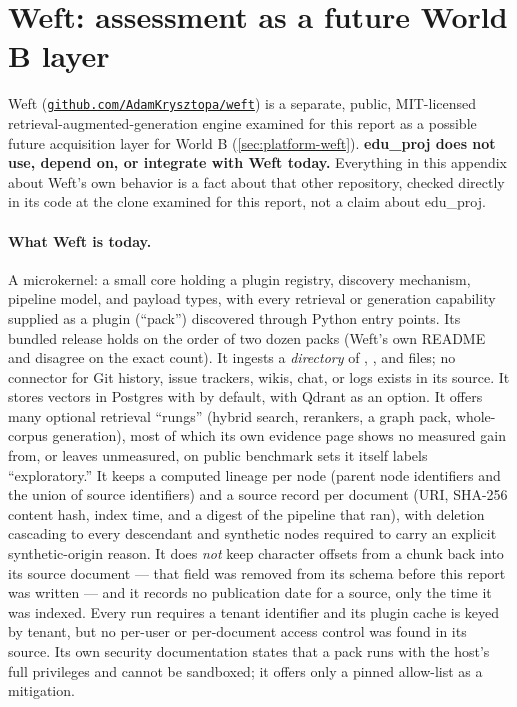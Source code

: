 \section{Weft: assessment as a future World B layer}
\label{app:weft}

Weft (\href{https://github.com/AdamKrysztopa/weft}{\nolinkurl{github.com/AdamKrysztopa/weft}}) is
a separate, public, MIT-licensed retrieval-augmented-generation engine examined for this report as
a possible future acquisition layer for World B (\cref{sec:platform-weft}). \textbf{edu\_proj does
not use, depend on, or integrate with Weft today.} Everything in this appendix about Weft's own
behavior is a fact about that other repository, checked directly in its code at the clone examined
for this report, not a claim about edu\_proj.

\paragraph{What Weft is today.}
A microkernel: a small core holding a plugin registry, discovery mechanism, pipeline model, and
payload types, with every retrieval or generation capability supplied as a plugin (``pack'')
discovered through Python entry points. Its bundled release holds on the order of two dozen packs
(Weft's own README and  disagree on the exact count). It ingests a
\emph{directory} of , , and  files; no connector for Git history,
issue trackers, wikis, chat, or logs exists in its source. It stores vectors in Postgres with
 by default, with Qdrant as an option. It offers many optional retrieval
``rungs'' (hybrid search, rerankers, a graph pack, whole-corpus generation), most of which its own
evidence page shows no measured gain from, or leaves unmeasured, on public benchmark sets it
itself labels ``exploratory.'' It keeps a computed lineage per node (parent node identifiers and
the union of source identifiers) and a source record per document (URI, SHA-256 content hash,
index time, and a digest of the pipeline that ran), with deletion cascading to every descendant
and synthetic nodes required to carry an explicit synthetic-origin reason. It does \emph{not} keep
character offsets from a chunk back into its source document --- that field was removed from its
schema before this report was written --- and it records no publication date for a source, only
the time it was indexed. Every run requires a tenant identifier and its plugin cache is keyed by
tenant, but no per-user or per-document access control was found in its source. Its own security
documentation states that a pack runs with the host's full privileges and cannot be sandboxed; it
offers only a pinned allow-list as a mitigation.

